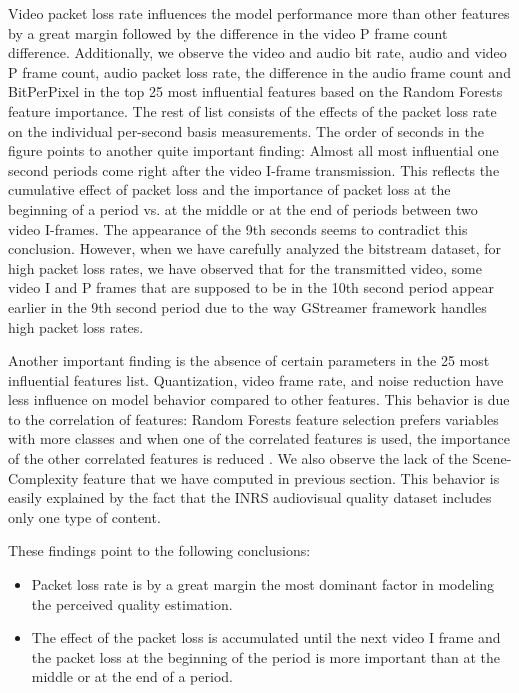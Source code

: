 \documentclass[journal]{IEEEtran}
\begin{document}
Video packet loss rate influences the model performance more than other features by a great margin followed by the difference in the video P frame count difference. Additionally, we observe the video and audio bit rate, audio and video P frame count, audio packet loss rate, the difference in the audio frame count and BitPerPixel in the top 25 most influential features based on the Random Forests feature importance.  The rest of list consists of the effects of the packet loss rate on the individual per-second basis measurements. The order of seconds in the figure points to another quite important finding: Almost all most influential one second periods come right after the video I-frame transmission. This reflects the cumulative effect of packet loss and the importance of packet loss at the beginning of a period vs. at the middle or at the end of periods between two video I-frames. The appearance of the 9th seconds seems to contradict this conclusion. However, when we have carefully analyzed the bitstream dataset, for high packet loss rates, we have observed that for the transmitted video, some video I and P frames that are supposed to be in the 10th second period appear earlier in the 9th second period due to the way GStreamer framework handles high packet loss rates.

Another important finding is the absence of certain parameters in the 25 most influential features list. Quantization, video frame rate, and noise reduction have less influence on model behavior compared to other features. This behavior is due to the correlation of features: Random Forests feature selection prefers variables with more classes and when one of the correlated features is used, the importance of the other correlated features is reduced \cite{strobl2007bias}. We also observe the lack of the Scene-Complexity feature that we have computed in previous section. This behavior is easily explained by the fact that the INRS audiovisual quality dataset includes only one type of content.

These findings point to the following conclusions:

\begin{itemize}
  \item Packet loss rate is by a great margin the most dominant factor in modeling the perceived quality estimation.
  \item The effect of the packet loss is accumulated until the next video I frame and the packet loss at the beginning of the period is more important than at the middle or at the end of a period.
\end{itemize}
\end{document}
